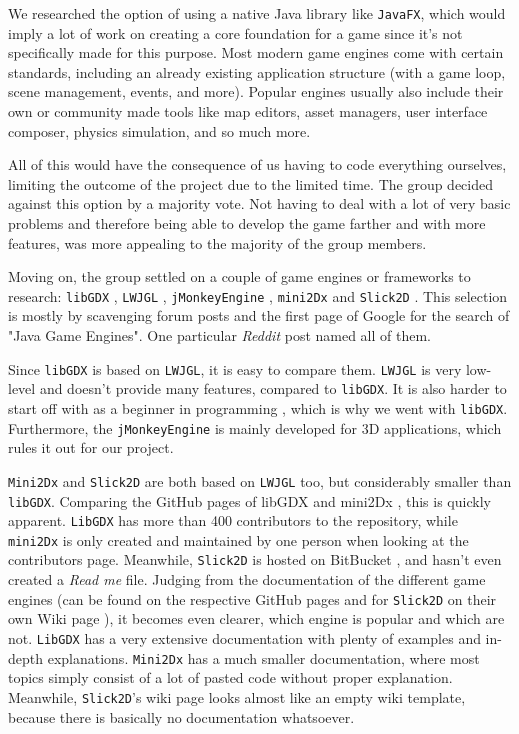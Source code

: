 \documentclass[12p]{article}
\begin{document}
We researched the option of using a native Java library like \texttt{JavaFX}, which would imply a lot of work on creating a core foundation for a game since it's not specifically made for this purpose. Most modern game engines come with certain standards, including an already existing application structure (with a game loop, scene management, events, and more). Popular engines usually also include their own or community made tools like map editors, asset managers, user interface composer, physics simulation, and so much more.

All of this would have the consequence of us having to code everything ourselves, limiting the outcome of the project due to the limited time. The group decided against this option by a majority vote. Not having to deal with a lot of very basic problems and therefore being able to develop the game farther and with more features, was more appealing to the majority of the group members.

Moving on, the group settled on a couple of game engines or frameworks to research: \texttt{libGDX} \cite{LibGDX}, \texttt{LWJGL} \cite{LWJGL}, \texttt{jMonkeyEngine} \cite{jMonkeyEngine}, \texttt{mini2Dx} \cite{mini2Dx} and \texttt{Slick2D} \cite{Slick2D}. This selection is mostly by scavenging forum posts and the first page of Google for the search of "Java Game Engines". One particular \emph{Reddit} post \cite{RedditJavaGameEngines} named all of them.

Since \texttt{libGDX} is based on \texttt{LWJGL}, it is easy to compare them. \texttt{LWJGL} is very low-level and doesn't provide many features, compared to \texttt{libGDX}. It is also harder to start off with as a beginner in programming \cite{StackExchangeLibGDXLWJGL}, which is why we went with \texttt{libGDX}. Furthermore, the \texttt{jMonkeyEngine} is mainly developed for 3D applications, which rules it out for our project. 

\texttt{Mini2Dx} and \texttt{Slick2D} are both based on \texttt{LWJGL} too, but considerably smaller than \texttt{libGDX}. Comparing the GitHub pages of libGDX \cite{libgDXGitHub} and mini2Dx \cite{mini2DxGitHub}, this is quickly apparent. \texttt{LibGDX} has more than 400 contributors to the repository, while \texttt{mini2Dx} is only created and maintained by one person when looking at the contributors page. Meanwhile, \texttt{Slick2D} is hosted on BitBucket \cite{Slick2DBitBucket}, and hasn't even created a \emph{Read me} file. Judging from the documentation of the different game engines (can be found on the respective GitHub pages and for \texttt{Slick2D} on their own Wiki page \cite{Slick2DWiki}), it becomes even clearer, which engine is popular and which are not. \texttt{LibGDX} has a very extensive documentation with plenty of examples and in-depth explanations. \texttt{Mini2Dx} has a much smaller documentation, where most topics simply consist of a lot of pasted code without proper explanation. Meanwhile, \texttt{Slick2D}'s wiki page looks almost like an empty wiki template, because there is basically no documentation whatsoever.
\end{document}
